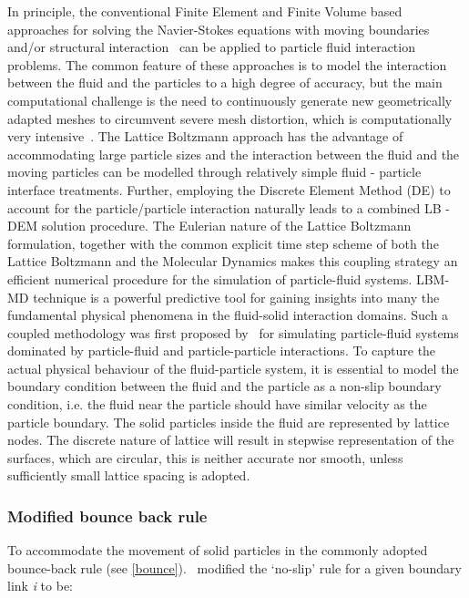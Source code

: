 In principle, the conventional Finite Element and Finite Volume based 
approaches for solving the Navier-Stokes equations with moving boundaries 
and/or structural interaction~\citep{Bathe2004} can be applied to particle 
fluid interaction problems. The common feature of these approaches is to model 
the interaction between the fluid and the particles to a high degree of 
accuracy, but the main computational challenge is the need to continuously 
generate new geometrically adapted meshes to circumvent severe mesh distortion, 
which is computationally very intensive~\citep{Han2007a}. The Lattice Boltzmann 
approach has the advantage of accommodating large particle sizes and the 
interaction between the fluid and the moving particles can be modelled through 
relatively simple fluid - particle interface treatments. Further, employing the 
Discrete Element Method (DE) to account for the particle/particle interaction 
naturally leads to a combined LB - DEM solution procedure. The Eulerian nature 
of the Lattice Boltzmann formulation, together with the common explicit time 
step scheme of both the Lattice Boltzmann and the Molecular Dynamics makes this 
coupling strategy an efficient numerical procedure for the simulation of 
particle-fluid systems. LBM-MD technique is a powerful predictive tool for 
gaining insights into many the fundamental physical phenomena in the 
fluid-solid interaction domains. Such a coupled methodology was first proposed 
by~\citep{Cook2004} for simulating particle-fluid systems dominated by 
particle-fluid and particle-particle interactions. To capture the actual 
physical behaviour of the fluid-particle system, it is essential to model the 
boundary condition between the fluid and the particle as a non-slip boundary 
condition, i.e. the fluid near the particle should have similar velocity as the 
particle boundary. The solid particles inside the fluid are represented by 
lattice nodes. The discrete nature of lattice will result in stepwise 
representation of the surfaces, which are circular, this is neither accurate 
nor smooth, unless sufficiently small lattice spacing is adopted. 


\subsubsection*{Modified bounce back rule}

To accommodate the movement of solid particles in the commonly adopted 
bounce-back rule (see \cref{bounce}).~\citet{Ladd1994} modified the `no-slip' 
rule for a given boundary link \textit{i} to be:

